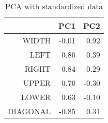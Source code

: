 \begin{table}[ht]
\centering
\begin{tabular}{rrr}
  \hline
 & PC1 & PC2 \\ 
  \hline
WIDTH & -0.01 & 0.92 \\ 
  LEFT & 0.80 & 0.39 \\ 
  RIGHT & 0.84 & 0.29 \\ 
  UPPER & 0.70 & -0.30 \\ 
  LOWER & 0.63 & -0.10 \\ 
  DIAGONAL & -0.85 & 0.31 \\ 
   \hline
\end{tabular}
\caption{PCA with standardized data} 
\end{table}
